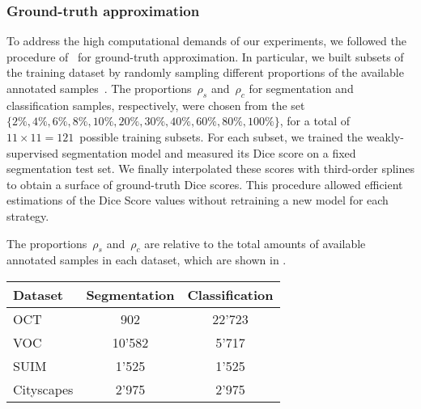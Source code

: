 \subsubsection{Ground-truth approximation}
To address the high computational demands of our experiments, we followed the procedure of~ for ground-truth approximation. 
In particular, we built subsets of the training dataset by randomly sampling different proportions of the available annotated samples~. The proportions~$\rho_s$ and~$\rho_c$ for segmentation and classification samples, respectively, were chosen from the set~$\{2\%, 4\%, 6\%, 8\%, 10\%, 20\%, 30\%, 40\%, 60\%, 80\%, 100\%\}$, for a total of $11\times{}11=121$~possible training subsets. For each subset, we trained the weakly-supervised segmentation model and measured its Dice score on a fixed segmentation test set. We finally interpolated these scores with third-order splines to obtain a surface of ground-truth Dice scores. This procedure allowed efficient estimations of the Dice Score values without retraining a new model for each strategy.

The proportions~$\rho_s$ and~$\rho_c$ are relative to the total amounts of available annotated samples in each dataset, which are shown in .

\begin{table}[h]
\centering
{}
\begin{tabular}{lcc}
\hline
\textbf{Dataset} & \textbf{Segmentation} & \textbf{Classification} \\ \hline
OCT & 902 & 22'723 \\
VOC & 10'582 & 5'717 \\
SUIM & 1'525 & 1'525 \\
Cityscapes & 2'975 & 2'975 \\ \hline
\end{tabular}

\end{table}
